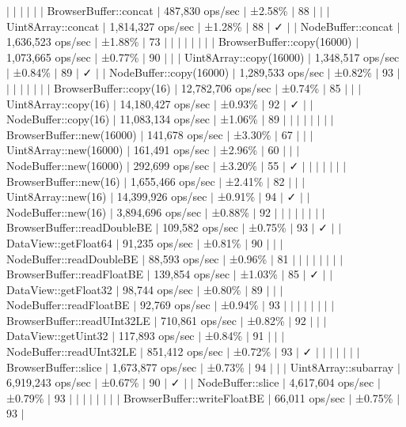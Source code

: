 $\vert$ $\vert$ $\vert$ $\vert$ $\vert$ $\vert$ Browser\+Buffer\+::concat $\vert$ 487,830 ops/sec $\vert$ ±2.58\% $\vert$ 88 $\vert$ $\vert$ $\vert$ Uint8\+Array\+::concat $\vert$ 1,814,327 ops/sec $\vert$ ±1.28\% $\vert$ 88 $\vert$ ✓ $\vert$ $\vert$ Node\+Buffer\+::concat $\vert$ 1,636,523 ops/sec $\vert$ ±1.88\% $\vert$ 73 $\vert$ $\vert$ $\vert$ $\vert$ $\vert$ $\vert$ $\vert$ $\vert$ Browser\+Buffer\+::copy(16000) $\vert$ 1,073,665 ops/sec $\vert$ ±0.77\% $\vert$ 90 $\vert$ $\vert$ $\vert$ Uint8\+Array\+::copy(16000) $\vert$ 1,348,517 ops/sec $\vert$ ±0.84\% $\vert$ 89 $\vert$ ✓ $\vert$ $\vert$ Node\+Buffer\+::copy(16000) $\vert$ 1,289,533 ops/sec $\vert$ ±0.82\% $\vert$ 93 $\vert$ $\vert$ $\vert$ $\vert$ $\vert$ $\vert$ $\vert$ $\vert$ Browser\+Buffer\+::copy(16) $\vert$ 12,782,706 ops/sec $\vert$ ±0.74\% $\vert$ 85 $\vert$ $\vert$ $\vert$ Uint8\+Array\+::copy(16) $\vert$ 14,180,427 ops/sec $\vert$ ±0.93\% $\vert$ 92 $\vert$ ✓ $\vert$ $\vert$ Node\+Buffer\+::copy(16) $\vert$ 11,083,134 ops/sec $\vert$ ±1.06\% $\vert$ 89 $\vert$ $\vert$ $\vert$ $\vert$ $\vert$ $\vert$ $\vert$ $\vert$ Browser\+Buffer\+::new(16000) $\vert$ 141,678 ops/sec $\vert$ ±3.30\% $\vert$ 67 $\vert$ $\vert$ $\vert$ Uint8\+Array\+::new(16000) $\vert$ 161,491 ops/sec $\vert$ ±2.96\% $\vert$ 60 $\vert$ $\vert$ $\vert$ Node\+Buffer\+::new(16000) $\vert$ 292,699 ops/sec $\vert$ ±3.20\% $\vert$ 55 $\vert$ ✓ $\vert$ $\vert$ $\vert$ $\vert$ $\vert$ $\vert$ $\vert$ Browser\+Buffer\+::new(16) $\vert$ 1,655,466 ops/sec $\vert$ ±2.41\% $\vert$ 82 $\vert$ $\vert$ $\vert$ Uint8\+Array\+::new(16) $\vert$ 14,399,926 ops/sec $\vert$ ±0.91\% $\vert$ 94 $\vert$ ✓ $\vert$ $\vert$ Node\+Buffer\+::new(16) $\vert$ 3,894,696 ops/sec $\vert$ ±0.88\% $\vert$ 92 $\vert$ $\vert$ $\vert$ $\vert$ $\vert$ $\vert$ $\vert$ $\vert$ Browser\+Buffer\+::read\+Double\+BE $\vert$ 109,582 ops/sec $\vert$ ±0.75\% $\vert$ 93 $\vert$ ✓ $\vert$ $\vert$ Data\+View\+::get\+Float64 $\vert$ 91,235 ops/sec $\vert$ ±0.81\% $\vert$ 90 $\vert$ $\vert$ $\vert$ Node\+Buffer\+::read\+Double\+BE $\vert$ 88,593 ops/sec $\vert$ ±0.96\% $\vert$ 81 $\vert$ $\vert$ $\vert$ $\vert$ $\vert$ $\vert$ $\vert$ $\vert$ Browser\+Buffer\+::read\+Float\+BE $\vert$ 139,854 ops/sec $\vert$ ±1.03\% $\vert$ 85 $\vert$ ✓ $\vert$ $\vert$ Data\+View\+::get\+Float32 $\vert$ 98,744 ops/sec $\vert$ ±0.80\% $\vert$ 89 $\vert$ $\vert$ $\vert$ Node\+Buffer\+::read\+Float\+BE $\vert$ 92,769 ops/sec $\vert$ ±0.94\% $\vert$ 93 $\vert$ $\vert$ $\vert$ $\vert$ $\vert$ $\vert$ $\vert$ $\vert$ Browser\+Buffer\+::read\+U\+Int32\+LE $\vert$ 710,861 ops/sec $\vert$ ±0.82\% $\vert$ 92 $\vert$ $\vert$ $\vert$ Data\+View\+::get\+Uint32 $\vert$ 117,893 ops/sec $\vert$ ±0.84\% $\vert$ 91 $\vert$ $\vert$ $\vert$ Node\+Buffer\+::read\+U\+Int32\+LE $\vert$ 851,412 ops/sec $\vert$ ±0.72\% $\vert$ 93 $\vert$ ✓ $\vert$ $\vert$ $\vert$ $\vert$ $\vert$ $\vert$ $\vert$ Browser\+Buffer\+::slice $\vert$ 1,673,877 ops/sec $\vert$ ±0.73\% $\vert$ 94 $\vert$ $\vert$ $\vert$ Uint8\+Array\+::subarray $\vert$ 6,919,243 ops/sec $\vert$ ±0.67\% $\vert$ 90 $\vert$ ✓ $\vert$ $\vert$ Node\+Buffer\+::slice $\vert$ 4,617,604 ops/sec $\vert$ ±0.79\% $\vert$ 93 $\vert$ $\vert$ $\vert$ $\vert$ $\vert$ $\vert$ $\vert$ $\vert$ Browser\+Buffer\+::write\+Float\+BE $\vert$ 66,011 ops/sec $\vert$ ±0.75\% $\vert$ 93 $\vert$ 